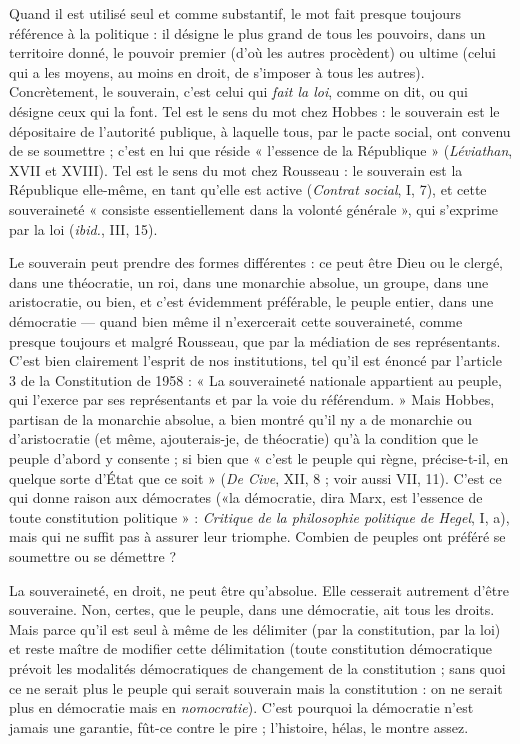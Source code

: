 Quand il est utilisé seul et comme substantif, le mot fait presque toujours
référence à la politique : il désigne le plus grand de tous les pouvoirs, dans un
territoire donné, le pouvoir premier (d’où les autres procèdent) ou ultime (celui
qui a les moyens, au moins en droit, de s’imposer à tous les autres). Concrètement,
le souverain, c’est celui qui {\it fait la loi}, comme on dit, ou qui désigne ceux
qui la font. Tel est le sens du mot chez Hobbes : le souverain est le dépositaire
de l’autorité publique, à laquelle tous, par le pacte social, ont convenu de se
soumettre ; c’est en lui que réside « l'essence de la République » ({\it Léviathan},
XVII et XVIII). Tel est le sens du mot chez Rousseau : le souverain est la République
elle-même, en tant qu’elle est active ({\it Contrat social}, I, 7), et cette souveraineté
« consiste essentiellement dans la volonté générale », qui s'exprime par
la loi ({\it ibid.}, III, 15).

Le souverain peut prendre des formes différentes : ce peut être Dieu ou le
clergé, dans une théocratie, un roi, dans une monarchie absolue, un groupe,
dans une aristocratie, ou bien, et c’est évidemment préférable, le peuple
entier, dans une démocratie — quand bien même il n’exercerait cette souveraineté,
comme presque toujours et malgré Rousseau, que par la médiation
de ses représentants. C’est bien clairement l'esprit de nos institutions, tel
qu’il est énoncé par l’article 3 de la Constitution de 1958 : « La souveraineté
nationale appartient au peuple, qui l’exerce par ses représentants et par la voie
du référendum. » Mais Hobbes, partisan de la monarchie absolue, a bien
montré qu'il ny a de monarchie ou d’aristocratie (et même, ajouterais-je, de
théocratie) qu’à la condition que le peuple d’abord y consente ; si bien que
« c’est le peuple qui règne, précise-t-il, en quelque sorte d’État que ce soit »
({\it De Cive}, XII, 8 ; voir aussi VII, 11). C’est ce qui donne raison aux démocrates
(«la démocratie, dira Marx, est l'essence de toute constitution
politique » : {\it Critique de la philosophie politique de Hegel}, I, a), mais qui ne
suffit pas à assurer leur triomphe. Combien de peuples ont préféré se soumettre
ou se démettre ?

La souveraineté, en droit, ne peut être qu’absolue. Elle cesserait autrement
d’être souveraine. Non, certes, que le peuple, dans une démocratie, ait tous les
droits. Mais parce qu’il est seul à même de les délimiter (par la constitution, par
la loi) et reste maître de modifier cette délimitation (toute constitution démocratique
prévoit les modalités démocratiques de changement de la
constitution ; sans quoi ce ne serait plus le peuple qui serait souverain mais la
constitution : on ne serait plus en démocratie mais en {\it nomocratie}). C'est pourquoi
la démocratie n’est jamais une garantie, fût-ce contre le pire ; l’histoire,
hélas, le montre assez.

